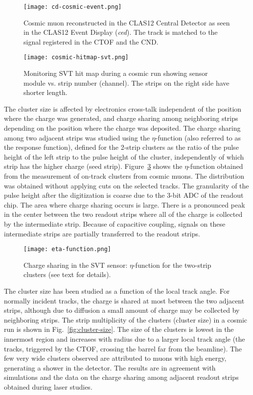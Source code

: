\begin{figure}[hbt] 
\centering 
\texttt{[image: cd-cosmic-event.png]}
\caption{Cosmic muon reconstructed in the CLAS12 Central Detector as seen in the CLAS12 Event Display
  ({\it ced}). The track is matched to the signal registered in the CTOF and the CND.}
\label{fig:cd-cosmic-event}
\end{figure}

\begin{figure}[hbt] 
\centering 
\texttt{[image: cosmic-hitmap-svt.png]}
\caption{Monitoring SVT hit map during a cosmic run showing sensor module vs. strip number (channel). The strips
  on the right side have shorter length.}
\label{fig:cosmic-hitmap-svt}
\end{figure}

The cluster size is affected by electronics cross-talk independent of the position where the charge was generated,
and charge sharing among neighboring strips depending on the position where the charge was deposited. The
charge sharing among two adjacent strips was studied using the $\eta$-function (also referred to as the response
function), defined for the 2-strip clusters as the ratio of the pulse height of the left strip to the pulse height of
the cluster, independently of which strip has the higher charge (seed strip). Figure~\ref{fig:eta-function} shows
the  $\eta$-function obtained from the measurement of on-track clusters from cosmic muons. The distribution
was obtained without applying cuts on the selected tracks. The granularity of the pulse height after the digitization
is coarse due to the 3-bit ADC of the readout chip. The area where charge sharing occurs is large. There is a
pronounced peak in the center between the two readout strips where all of the charge is collected by the
intermediate strip. Because of capacitive coupling, signals on these intermediate strips are partially transferred to
the readout strips.

\begin{figure}[hbt] 
\centering 
\texttt{[image: eta-function.png]}
\caption{Charge sharing in the SVT sensor: $\eta$-function for the two-strip clusters (see text for details).}
\label{fig:eta-function}
\end{figure}

The cluster size has been studied as a function of the local track angle. For normally incident tracks, the charge
is shared at most between the two adjacent strips, although due to diffusion a small amount of charge may be
collected by neighboring strips. The strip multiplicity of the clusters (cluster size) in a cosmic run is shown in
Fig.~\ref{fig:cluster-size}. The size of the clusters is lowest in the innermost region and increases with radius
due to a larger local track angle (the tracks, triggered by the CTOF, crossing the barrel far from the beamline).
The few very wide clusters observed are attributed to muons with high energy, generating a shower in the
detector. The results are in agreement with simulations and the data on the charge sharing among adjacent
readout strips obtained during laser studies.

